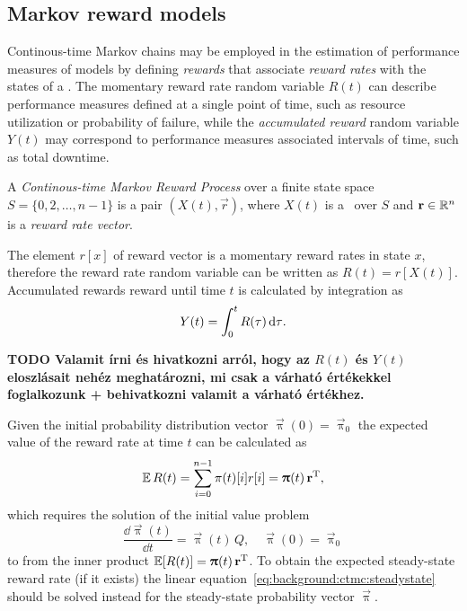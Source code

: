 \subsection{Markov reward models}

Continous-time Markov chains may be employed in the estimation of
performance measures of models by defining \emph{rewards} that
associate \emph{reward rates} with the states of a \CTMC. The
momentary reward rate random variable $R(t)$ can describe performance
measures defined at a single point of time, such as resource
utilization or probability of failure, while the \emph{accumulated
  reward} random variable $Y(t)$ may correspond to performance
measures associated intervals of time, such as total downtime.

\begin{dfn}
  A \emph{Continous-time Markov Reward Process} over a finite state
  space $S = \{0, 2, \ldots, n - 1\}$ is a pair $(X(t), \vec{r})$,
  where $X(t)$ is a \CTMC\ over $S$ and $\bm{\mathrm{r}} \in \mathbb{R}^n$ is a
  \emph{reward rate vector}.
\end{dfn}

The element $r[x]$ of reward vector is a momentary reward rates in
state $x$, therefore the reward rate random variable can be written as
$R(t) = r[X(t)]$. Accumulated rewards reward until time $t$ is
calculated by integration as
\begin{equation}
  Y(t) = \int_{0}^t R(\tau) \, \mathrm{d} \tau \text.
\end{equation}

\textbf{TODO Valamit írni és hivatkozni arról, hogy az $R(t)$ és
  $Y(t)$ eloszlásait nehéz meghatározni, mi csak a várható értékekkel
  foglalkozunk + behivatkozni valamit a várható értékhez.}

Given the initial probability distribution vector
$\vec{\uppi}(0) = \vec{\uppi}_0$ the expected value of the reward rate
at time $t$ can be calculated as
\begin{equation}
  \label{eq:background:ctmc:reward}
  \operatorname{\mathbb{E}} R(t) = \sum_{i = 0}^{n - 1} \pi(t)[i] r[i] = \bm{\mathrm{\uppi}}(t)
  \, \bm{\mathrm{r}}^{\mathrm{T}} \text,
\end{equation}
which requires the solution of the initial value problem
\begin{equation}
  \frac{\dd \vec{\uppi}(t)}{\dd t} = \vec{\uppi}(t) \, Q, \quad
  \vec{\uppi}(0) = \vec{\uppi}_0
\end{equation}
to from the inner product $ \operatorname{\mathbb{E}}[R(t)] = \bm{\mathrm{\uppi}}(t) \,
\bm{\mathrm{r}}^{\mathrm{T}}$.
To obtain the expected steady-state reward rate (if it exists) the
linear equation~\eqref{eq:background:ctmc:steadystate} should be solved
instead for the steady-state probability vector $\vec{\uppi}$.

